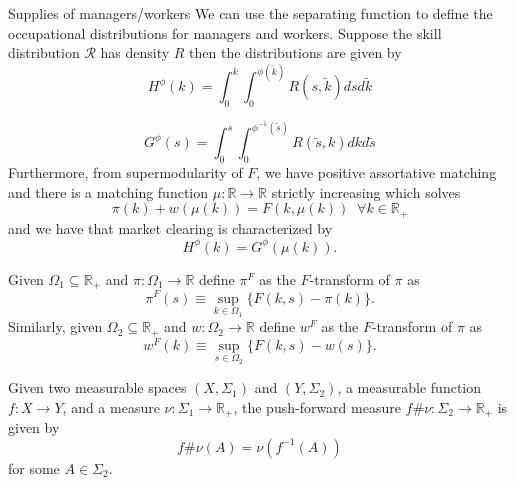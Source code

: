 \documentclass{beamer}
\begin{document}
	
	\begin{frame}{Supplies of managers/workers}
		We can use the separating function to define the occupational distributions for managers and workers. Suppose the skill distribution $\mathcal{R}$ has density $R$ then the distributions are given by 
		\begin{equation*}
			H^\phi(k) = \int_0^k\int_0^{\phi(\tilde{k})} R(s,\tilde{k})dsd\tilde{k}
		\end{equation*}
		
		\begin{equation*}
			G^\phi(s) = \int_0^s\int_0^{\phi^{-1}(\tilde{s})} R(\tilde{s},k)dkd\tilde{s}
		\end{equation*}
		Furthermore, from supermodularity of $F$, we have positive assortative matching and there is a matching function $\mu:\mathbb{R}\to\mathbb{R}$ strictly increasing which solves 
		\begin{equation*}
			\pi(k) + w(\mu(k)) = F(k,\mu(k)) \;\; \forall k \in \mathbb{R}_+
		\end{equation*}
		and we have that market clearing is characterized by
		\begin{equation*}
			H^\phi(k) = G^\phi(\mu(k)).
		\end{equation*}
	\end{frame}
	
	\begin{frame}
		\begin{definition}[$F$-transform]
			Given $\Omega_1\subseteq\mathbb{R}_+$ and $\pi:\Omega_1 \to \mathbb{R}$ define $\pi^F$ as the $F$-transform of $\pi$ as
			\begin{equation*}
				\pi^F(s) \equiv \sup_{k\in\Omega_1}\{F(k,s) - \pi(k)\}.
			\end{equation*}
			Similarly, given $\Omega_2\subseteq\mathbb{R}_+$ and $w:\Omega_2 \to \mathbb{R}$ define $w^F$ as the $F$-transform of $\pi$ as
				\begin{equation*}
				w^F(k) \equiv \sup_{s\in\Omega_2}\{F(k,s) - w(s)\}.
			\end{equation*}
		\end{definition}
		
				\begin{definition}
		Given two measurable spaces $(X,\Sigma_1)$ and $(Y,\Sigma_2)$, a measurable function $f:X \to Y$, and a measure $\nu:\Sigma_1 \to \mathbb{R}_+$, the push-forward measure $f\#\nu:\Sigma_2\to\mathbb{R}_+$ is given by
		\begin{equation*}
			f\#\nu(A) = \nu(f^{-1}(A))
		\end{equation*}
		for some $A\in\Sigma_2$.
		\end{definition}
	\end{frame}
	
\end{document}
